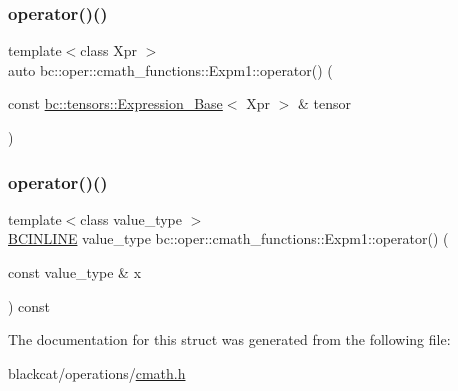 \mbox{\label{structbc_1_1oper_1_1cmath__functions_1_1Expm1_a49b235857c7d3620212b02066a98781b}} 
\subsubsection{\texorpdfstring{operator()()}{operator()()}\hspace{0.1cm}{\footnotesize\ttfamily [2/3]}}
{\footnotesize\ttfamily template$<$class Xpr $>$ \\
auto bc\+::oper\+::cmath\+\_\+functions\+::\+Expm1\+::operator() (\begin{DoxyParamCaption}\item[{const \hyperlink{classbc_1_1tensors_1_1Expression__Base}{bc\+::tensors\+::\+Expression\+\_\+\+Base}$<$ Xpr $>$ \&}]{tensor }\end{DoxyParamCaption})\hspace{0.3cm}{\ttfamily [inline]}}

\mbox{\label{structbc_1_1oper_1_1cmath__functions_1_1Expm1_a5698a1a90d722073f67b59c5382a4c8f}} 
\subsubsection{\texorpdfstring{operator()()}{operator()()}\hspace{0.1cm}{\footnotesize\ttfamily [3/3]}}
{\footnotesize\ttfamily template$<$class value\+\_\+type $>$ \\
\hyperlink{common_8h_a6699e8b0449da5c0fafb878e59c1d4b1}{B\+C\+I\+N\+L\+I\+NE} value\+\_\+type bc\+::oper\+::cmath\+\_\+functions\+::\+Expm1\+::operator() (\begin{DoxyParamCaption}\item[{const value\+\_\+type \&}]{x }\end{DoxyParamCaption}) const\hspace{0.3cm}{\ttfamily [inline]}}



The documentation for this struct was generated from the following file\+:\begin{DoxyCompactItemize}
\item 
blackcat/operations/\hyperlink{cmath_8h}{cmath.\+h}\end{DoxyCompactItemize}
